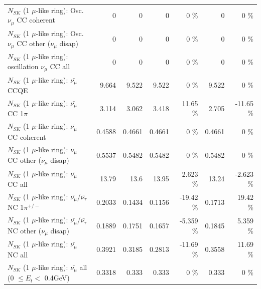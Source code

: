 \begin{table}
\begin{tabular}{| l | r | r | r  r | r  r |}
                        $N_{SK}$ (1 $\mu$-like ring): Osc. $\nu_\mu$ CC coherent &               0 &               0 &               0 &        0 \%  &               0 &        0 \%  \\ 
         $N_{SK}$ (1 $\mu$-like ring): Osc. $\nu_\mu$ CC other ($\nu_\mu$ disap) &               0 &               0 &               0 &        0 \%  &               0 &        0 \%  \\ 
                      $N_{SK}$ (1 $\mu$-like ring): oscillation $\nu_\mu$ CC all &               0 &               0 &               0 &        0 \%  &               0 &        0 \%  \\ 
\hline
\hline
                              $N_{SK}$ (1 $\mu$-like ring): $\bar{\nu_\mu}$ CCQE &           9.664 &           9.522 &           9.522 &        0 \%  &           9.522 &        0 \%  \\ 
                         $N_{SK}$ (1 $\mu$-like ring): $\bar{\nu_\mu}$ CC 1$\pi$ &           3.114 &           3.062 &           3.418 &    11.65 \%  &           2.705 &   -11.65 \%  \\ 
                       $N_{SK}$ (1 $\mu$-like ring): $\bar{\nu_\mu}$ CC coherent &          0.4588 &          0.4661 &          0.4661 &        0 \%  &          0.4661 &        0 \%  \\ 
        $N_{SK}$ (1 $\mu$-like ring): $\bar{\nu_\mu}$ CC other ($\nu_\mu$ disap) &          0.5537 &          0.5482 &          0.5482 &        0 \%  &          0.5482 &        0 \%  \\ 
                          $N_{SK}$ (1 $\mu$-like ring): $\bar{\nu_{\mu}}$ CC all &           13.79 &            13.6 &           13.95 &    2.623 \%  &           13.24 &   -2.623 \%  \\ 
\hline
  $N_{SK}$ (1 $\mu$-like ring): $\bar{\nu_\mu}$/$\bar{\nu_\tau}$ NC 1$\pi^{+/-}$ &          0.2033 &          0.1434 &          0.1156 &   -19.42 \%  &          0.1713 &    19.42 \%  \\ 
$N_{SK}$ (1 $\mu$-like ring): $\bar{\nu_\mu}$/$\bar{\nu_\tau}$ NC other ($\nu_\mu$ disap) &          0.1889 &          0.1751 &          0.1657 &   -5.359 \%  &          0.1845 &    5.359 \%  \\ 
                          $N_{SK}$ (1 $\mu$-like ring): $\bar{\nu_{\mu}}$ NC all &          0.3921 &          0.3185 &          0.2813 &   -11.69 \%  &          0.3558 &    11.69 \%  \\ 
\hline
   $N_{SK}$ (1 $\mu$-like ring): $\bar{\nu_{\mu}}$ all (0 $\leq E_{t} <$ 0.4GeV) &          0.3318 &           0.333 &           0.333 &        0 \%  &           0.333 &        0 \%  \\ 

\end{tabular}
\end{table}
